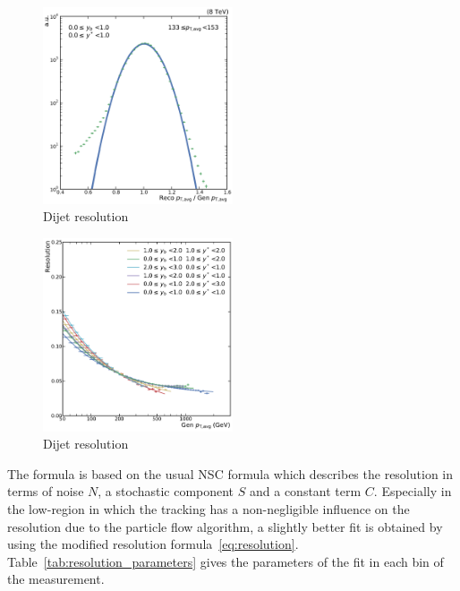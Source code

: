 \begin{figure}[htbp]
    \centering
    \includegraphics[width=0.5\textwidth]{figures/measurement/resolution_yb0ys0_bin10.pdf}
    \caption{Dijet \ptavg resolution}
    \label{fig:resolution_bin}
\end{figure}


\begin{figure}[htbp]
    \centering
    \includegraphics[width=0.5\textwidth]{figures/measurement/resolution_ptavg.pdf}
    \caption{Dijet \ptavg resolution}
    \label{fig:resolution_ptavg}
\end{figure}

The formula is based on the usual NSC formula which describes the resolution in
terms of noise $N$, a stochastic component $S$ and a constant term $C$.
Especially in the low-\pt region in which the tracking has a non-negligible
influence on the resolution due to the particle flow algorithm, a slightly
better fit is obtained by using the modified resolution
formula~\ref{eq:resolution}. Table~\ref{tab:resolution_parameters} gives the
parameters of the fit in each bin of the measurement.


